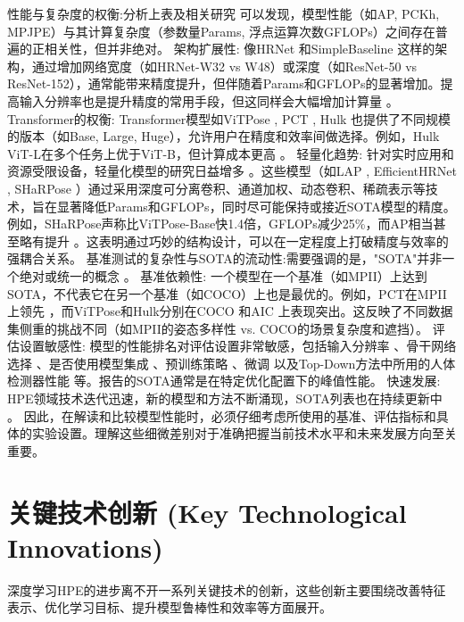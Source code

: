 \documentclass[12pt,a4paper]{article}
\begin{document}
性能与复杂度的权衡:分析上表及相关研究 \cite{Sun2019HRNet} 可以发现，模型性能（如AP, PCKh, MPJPE）与其计算复杂度（参数量Params, 浮点运算次数GFLOPs）之间存在普遍的正相关性，但并非绝对。
架构扩展性: 像HRNet \cite{Sun2019HRNet} 和SimpleBaseline \cite{Sun2019HRNet} 这样的架构，通过增加网络宽度（如HRNet-W32 vs W48）或深度（如ResNet-50 vs ResNet-152），通常能带来精度提升，但伴随着Params和GFLOPs的显著增加。提高输入分辨率也是提升精度的常用手段，但这同样会大幅增加计算量 \cite{Sun2019HRNet}。
Transformer的权衡: Transformer模型如ViTPose \cite{Xu2022ViTPose}, PCT \cite{Geng2023PCT}, Hulk \cite{Wang2023HulkCVPR} 也提供了不同规模的版本（如Base, Large, Huge），允许用户在精度和效率间做选择。例如，Hulk ViT-L在多个任务上优于ViT-B，但计算成本更高 \cite{Wang2023HulkCVPR}。
轻量化趋势: 针对实时应用和资源受限设备，轻量化模型的研究日益增多 \cite{Liu2020SMSNet}。这些模型（如LAP \cite{Zhang2020LAPNet}, EfficientHRNet \cite{Wang2020EfficientHRNet}, SHaRPose \cite{Sun2023SHaRPose}）通过采用深度可分离卷积、通道加权、动态卷积、稀疏表示等技术，旨在显著降低Params和GFLOPs，同时尽可能保持或接近SOTA模型的精度。例如，SHaRPose声称比ViTPose-Base快1.4倍，GFLOPs减少25\%，而AP相当甚至略有提升 \cite{Sun2023SHaRPose}。这表明通过巧妙的结构设计，可以在一定程度上打破精度与效率的强耦合关系。
基准测试的复杂性与SOTA的流动性:需要强调的是，"SOTA"并非一个绝对或统一的概念 \cite{Sun2019HRNet}。
基准依赖性: 一个模型在一个基准（如MPII）上达到SOTA，不代表它在另一个基准（如COCO）上也是最优的。例如，PCT在MPII上领先 \cite{Geng2023PCT}，而ViTPose和Hulk分别在COCO \cite{Xu2022ViTPose} 和AIC \cite{Wang2023HulkCVPR} 上表现突出。这反映了不同数据集侧重的挑战不同（如MPII的姿态多样性 vs. COCO的场景复杂度和遮挡）。
评估设置敏感性: 模型的性能排名对评估设置非常敏感，包括输入分辨率 \cite{Sun2019HRNet}、骨干网络选择 \cite{Sun2019HRNet}、是否使用模型集成 \cite{Sun2019HRNet}、预训练策略 \cite{Sun2019HRNet}、微调 \cite{Sun2019HRNet} 以及Top-Down方法中所用的人体检测器性能 \cite{Chen2018CPN} 等。报告的SOTA通常是在特定优化配置下的峰值性能。
快速发展: HPE领域技术迭代迅速，新的模型和方法不断涌现，SOTA列表也在持续更新中 \cite{Wang2023TransformerSurvey}。
因此，在解读和比较模型性能时，必须仔细考虑所使用的基准、评估指标和具体的实验设置。理解这些细微差别对于准确把握当前技术水平和未来发展方向至关重要。

\section{关键技术创新 (Key Technological Innovations)}
深度学习HPE的进步离不开一系列关键技术的创新，这些创新主要围绕改善特征表示、优化学习目标、提升模型鲁棒性和效率等方面展开。
\end{document}
